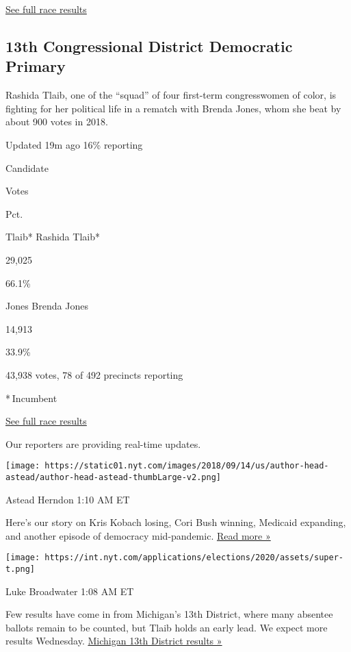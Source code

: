 \href{https://www.nytimes.com/interactive/2020/08/04/us/elections/results-michigan-house-district-6-primary-election.html}{See
full race results}

\hypertarget{13th-congressional-district-democratic-primary}{%
\subsection{13th Congressional District Democratic
Primary}\label{13th-congressional-district-democratic-primary}}

Rashida Tlaib, one of the ``squad'' of four first-term congresswomen of
color, is fighting for her political life in a rematch with Brenda
Jones, whom she beat by about 900 votes in 2018.

Updated 19m ago 16\% reporting

Candidate

Votes

Pct.

 Tlaib* Rashida Tlaib*

29,025

66.1\%

 Jones Brenda Jones

14,913

33.9\%

43,938 votes, 78 of 492 precincts reporting

* Incumbent

\href{https://www.nytimes.com/interactive/2020/08/04/us/elections/results-michigan-house-district-13-primary-election.html}{See
full race results}

Our reporters are providing real-time updates.

\texttt{[image: https://static01.nyt.com/images/2018/09/14/us/author-head-astead/author-head-astead-thumbLarge-v2.png]}

Astead Herndon 1:10 AM ET

Here's our story on Kris Kobach losing, Cori Bush winning, Medicaid
expanding, and another episode of democracy mid-pandemic.
\href{https://www.nytimes.com/2020/08/04/us/politics/kobach-tlaib.html?action=click\&module=ELEX_results\&pgtype=Interactive\&region=ReporterUpdates}{Read
more »}

\texttt{[image: https://int.nyt.com/applications/elections/2020/assets/super-t.png]}

Luke Broadwater 1:08 AM ET

Few results have come in from Michigan's 13th District, where many
absentee ballots remain to be counted, but Tlaib holds an early lead. We
expect more results Wednesday.
\href{https://www.nytimes.com/interactive/2020/08/04/us/elections/results-michigan-house-district-13-primary-election.html?action=click\&module=ELEX_results\&pgtype=Interactive\&region=ReporterUpdates}{Michigan
13th District results »}


